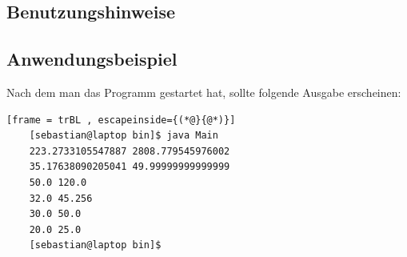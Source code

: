 \subsection{Benutzungshinweise}


\subsection{Anwendungsbeispiel}
Nach dem man das Programm gestartet hat, sollte folgende Ausgabe erscheinen:
\begin{lstlisting}[frame = trBL , escapeinside={(*@}{@*)}]
	[sebastian@laptop bin]$ java Main
	223.2733105547887 2808.779545976002
	35.17638090205041 49.99999999999999
	50.0 120.0
	32.0 45.256
	30.0 50.0
	20.0 25.0
	[sebastian@laptop bin]$ 
\end{lstlisting}